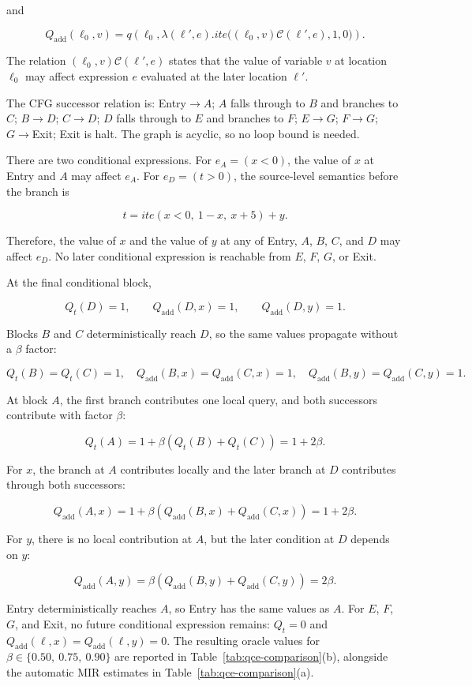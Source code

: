 \documentclass[conference]{IEEEtran}
\newcommand{\ite}{\mathit{ite}}
\begin{document}
and

\[
Q_{\mathrm{add}}(\ell_0,v)
=
q\left(
\ell_0,
\lambda(\ell',e).
\ite\bigl((\ell_0,v)\mathcal C(\ell',e),1,0\bigr)
\right).
\]

The relation \((\ell_0,v)\mathcal C(\ell',e)\) states that the value of
variable \(v\) at location \(\ell_0\) may affect expression \(e\) evaluated at
the later location \(\ell'\).

The CFG successor relation is:
Entry\(\to A\); \(A\) falls through to \(B\) and branches to \(C\);
\(B\to D\); \(C\to D\); \(D\) falls through to \(E\) and branches to \(F\);
\(E\to G\); \(F\to G\); \(G\to\)Exit; Exit is halt. The graph is acyclic, so
no loop bound is needed.

There are two conditional expressions. For \(e_A=(x<0)\), the value of \(x\)
at Entry and \(A\) may affect \(e_A\). For \(e_D=(t>0)\), the source-level
semantics before the branch is

\[
t = \ite(x < 0,\ 1 - x,\ x + 5) + y.
\]

Therefore, the value of \(x\) and the value of \(y\) at any of Entry, \(A\),
\(B\), \(C\), and \(D\) may affect \(e_D\). No later conditional expression is
reachable from \(E\), \(F\), \(G\), or Exit.

At the final conditional block,

\[
Q_t(D)=1,\qquad
Q_{\mathrm{add}}(D,x)=1,\qquad
Q_{\mathrm{add}}(D,y)=1.
\]

Blocks \(B\) and \(C\) deterministically reach \(D\), so the same values
propagate without a \(\beta\) factor:

\[
Q_t(B)=Q_t(C)=1,
\quad
Q_{\mathrm{add}}(B,x)=Q_{\mathrm{add}}(C,x)=1,
\quad
Q_{\mathrm{add}}(B,y)=Q_{\mathrm{add}}(C,y)=1.
\]

At block \(A\), the first branch contributes one local query, and both
successors contribute with factor \(\beta\):

\[
Q_t(A)=1+\beta(Q_t(B)+Q_t(C))=1+2\beta.
\]

For \(x\), the branch at \(A\) contributes locally and the later branch at
\(D\) contributes through both successors:

\[
Q_{\mathrm{add}}(A,x)
=
1+\beta(Q_{\mathrm{add}}(B,x)+Q_{\mathrm{add}}(C,x))
=
1+2\beta.
\]

For \(y\), there is no local contribution at \(A\), but the later condition at
\(D\) depends on \(y\):

\[
Q_{\mathrm{add}}(A,y)
=
\beta(Q_{\mathrm{add}}(B,y)+Q_{\mathrm{add}}(C,y))
=
2\beta.
\]

Entry deterministically reaches \(A\), so Entry has the same values as \(A\).
For \(E\), \(F\), \(G\), and Exit, no future conditional expression remains:
\(Q_t=0\) and \(Q_{\mathrm{add}}(\ell,x)=Q_{\mathrm{add}}(\ell,y)=0\). The
resulting oracle values for \(\beta \in \{0.50,\ 0.75,\ 0.90\}\) are reported
in Table~\ref{tab:qce-comparison}(b), alongside the automatic MIR estimates in
Table~\ref{tab:qce-comparison}(a).
\end{document}
